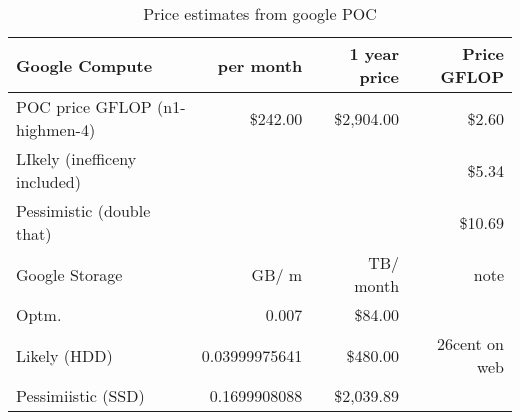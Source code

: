 \tiny \begin{longtable} { |p{}  |r  |r  |r |}
\caption{Price estimates from google POC \label{tab:Google}}\\
\hline
{Google Compute}&{per month}&{1 year price}&{Price GFLOP} \\ \hline
{POC price GFLOP (n1-highmen-4)}&{\$242.00}&{\$2,904.00}&{\$2.60} \\ \hline
{LIkely (inefficeny included)}&{}&{}&{\$5.34} \\ \hline
{Pessimistic (double that)}&{}&{}&{\$10.69} \\ \hline
{Google Storage}&{GB/ m}&{TB/ month}&{note } \\ \hline
{Optm. }&{0.007}&{\$84.00}& \\ \hline
{Likely (HDD)}&{0.03999975641}&{\$480.00}&{26cent on web} \\ \hline
{Pessimiistic (SSD)}&{0.1699908088}&{\$2,039.89}& \\ \hline
\end{longtable} \normalsize
